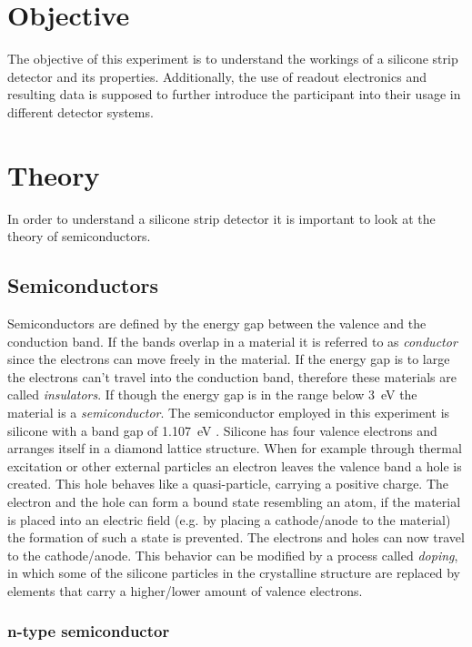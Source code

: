 \section{Objective}
\label{sec:Obj}
The objective of this experiment is to understand the workings of a silicone strip detector and its properties. Additionally, the use of readout electronics and resulting data is supposed to further introduce the participant into their usage in different detector systems.
\section{Theory}
\label{sec:Theo}

In order to understand a silicone strip detector it is important to look at the theory of semiconductors.
\subsection{Semiconductors}
Semiconductors are defined by the energy gap between the valence and the conduction band. If the bands overlap in a material it is referred to as \textit{conductor} since the electrons can move freely in the material. If the energy gap is to large the electrons can't travel into the conduction band, therefore these materials are called \textit{insulators}. If though the energy gap is in the range below \qty{3}{\eV} the material is a \textit{semiconductor}. The semiconductor employed in this experiment is silicone with a band gap of \qty{1.107}{\eV} \cite{V15}. Silicone has four valence electrons and arranges itself in a diamond lattice structure. When for example through thermal excitation or other external particles an electron leaves the valence band a hole is created. This hole behaves like a quasi-particle, carrying a positive charge. The electron and the hole can form a bound state resembling an atom, if the material is placed into an electric field (e.g. by placing a cathode/anode to the material) the formation of such a state is prevented. The electrons and holes can now travel to the cathode/anode. This behavior can be modified by a process called \textit{doping}, in which some of the silicone particles in the crystalline structure are replaced by elements that carry a higher/lower amount of valence electrons. %

\subsubsection{n-type semiconductor}

